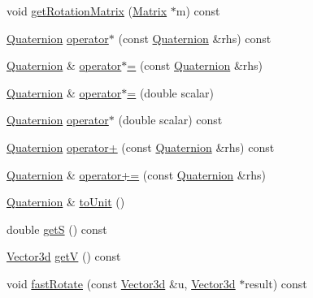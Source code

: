 \begin{DoxyCompactItemize}
void \hyperlink{classCartWheel_1_1Math_1_1Quaternion_a6fb61f1c94f1ee13fd90f75c5e1e021b}{getRotationMatrix} (\hyperlink{classCartWheel_1_1Math_1_1Matrix}{Matrix} $\ast$m) const 
\item 
\hyperlink{classCartWheel_1_1Math_1_1Quaternion}{Quaternion} \hyperlink{classCartWheel_1_1Math_1_1Quaternion_a2c0b7e2bccac0e3b060d34a717766e82}{operator$\ast$} (const \hyperlink{classCartWheel_1_1Math_1_1Quaternion}{Quaternion} \&rhs) const 
\item 
\hyperlink{classCartWheel_1_1Math_1_1Quaternion}{Quaternion} \& \hyperlink{classCartWheel_1_1Math_1_1Quaternion_a1ce8c3d9748274407b75769518a423a1}{operator$\ast$=} (const \hyperlink{classCartWheel_1_1Math_1_1Quaternion}{Quaternion} \&rhs)
\item 
\hyperlink{classCartWheel_1_1Math_1_1Quaternion}{Quaternion} \& \hyperlink{classCartWheel_1_1Math_1_1Quaternion_aeb9598aa34468c5b574edbe426ac804d}{operator$\ast$=} (double scalar)
\item 
\hyperlink{classCartWheel_1_1Math_1_1Quaternion}{Quaternion} \hyperlink{classCartWheel_1_1Math_1_1Quaternion_acc184b31d51f8c0289d3e2b8480f417c}{operator$\ast$} (double scalar) const 
\item 
\hyperlink{classCartWheel_1_1Math_1_1Quaternion}{Quaternion} \hyperlink{classCartWheel_1_1Math_1_1Quaternion_a79270e624e3e99620857535b3c8565a1}{operator+} (const \hyperlink{classCartWheel_1_1Math_1_1Quaternion}{Quaternion} \&rhs) const 
\item 
\hyperlink{classCartWheel_1_1Math_1_1Quaternion}{Quaternion} \& \hyperlink{classCartWheel_1_1Math_1_1Quaternion_a2ae0c9a6064b0a9fa9f0687dd39e318d}{operator+=} (const \hyperlink{classCartWheel_1_1Math_1_1Quaternion}{Quaternion} \&rhs)
\item 
\hyperlink{classCartWheel_1_1Math_1_1Quaternion}{Quaternion} \& \hyperlink{classCartWheel_1_1Math_1_1Quaternion_adc58210f642a0b83b72cad062b9beb0e}{toUnit} ()
\item 
double \hyperlink{classCartWheel_1_1Math_1_1Quaternion_a9d4adca20ef925eb7d6f8bdb1be46363}{getS} () const 
\item 
\hyperlink{classCartWheel_1_1Math_1_1Vector3d}{Vector3d} \hyperlink{classCartWheel_1_1Math_1_1Quaternion_a1ce2ae630d5e8c7eae0c0fcb2e501ea3}{getV} () const 
\item 
void \hyperlink{classCartWheel_1_1Math_1_1Quaternion_a78c391f21f30d1751909ee001778b4d9}{fastRotate} (const \hyperlink{classCartWheel_1_1Math_1_1Vector3d}{Vector3d} \&u, \hyperlink{classCartWheel_1_1Math_1_1Vector3d}{Vector3d} $\ast$result) const 

\end{DoxyCompactItemize}
